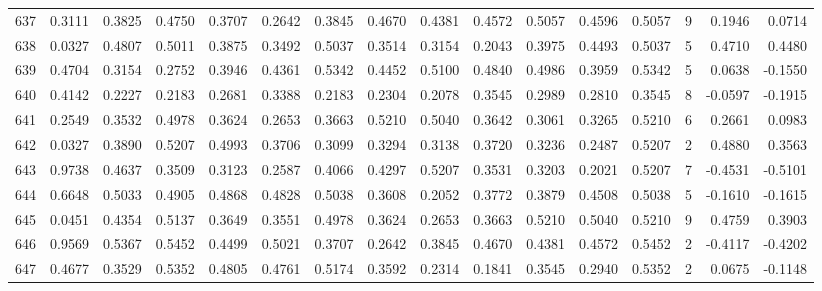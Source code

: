 \begin{tabular}{lrrrrrrrrrrrrrrr}
637 &      0.3111 &  0.3825 &  0.4750 &  0.3707 &  0.2642 &  0.3845 &  0.4670 &  0.4381 &  0.4572 &  0.5057 &   0.4596 &     0.5057 &      9 &                    0.1946 &                     0.0714 \\
638 &      0.0327 &  0.4807 &  0.5011 &  0.3875 &  0.3492 &  0.5037 &  0.3514 &  0.3154 &  0.2043 &  0.3975 &   0.4493 &     0.5037 &      5 &                    0.4710 &                     0.4480 \\
639 &      0.4704 &  0.3154 &  0.2752 &  0.3946 &  0.4361 &  0.5342 &  0.4452 &  0.5100 &  0.4840 &  0.4986 &   0.3959 &     0.5342 &      5 &                    0.0638 &                    -0.1550 \\
640 &      0.4142 &  0.2227 &  0.2183 &  0.2681 &  0.3388 &  0.2183 &  0.2304 &  0.2078 &  0.3545 &  0.2989 &   0.2810 &     0.3545 &      8 &                   -0.0597 &                    -0.1915 \\
641 &      0.2549 &  0.3532 &  0.4978 &  0.3624 &  0.2653 &  0.3663 &  0.5210 &  0.5040 &  0.3642 &  0.3061 &   0.3265 &     0.5210 &      6 &                    0.2661 &                     0.0983 \\
642 &      0.0327 &  0.3890 &  0.5207 &  0.4993 &  0.3706 &  0.3099 &  0.3294 &  0.3138 &  0.3720 &  0.3236 &   0.2487 &     0.5207 &      2 &                    0.4880 &                     0.3563 \\
643 &      0.9738 &  0.4637 &  0.3509 &  0.3123 &  0.2587 &  0.4066 &  0.4297 &  0.5207 &  0.3531 &  0.3203 &   0.2021 &     0.5207 &      7 &                   -0.4531 &                    -0.5101 \\
644 &      0.6648 &  0.5033 &  0.4905 &  0.4868 &  0.4828 &  0.5038 &  0.3608 &  0.2052 &  0.3772 &  0.3879 &   0.4508 &     0.5038 &      5 &                   -0.1610 &                    -0.1615 \\
645 &      0.0451 &  0.4354 &  0.5137 &  0.3649 &  0.3551 &  0.4978 &  0.3624 &  0.2653 &  0.3663 &  0.5210 &   0.5040 &     0.5210 &      9 &                    0.4759 &                     0.3903 \\
646 &      0.9569 &  0.5367 &  0.5452 &  0.4499 &  0.5021 &  0.3707 &  0.2642 &  0.3845 &  0.4670 &  0.4381 &   0.4572 &     0.5452 &      2 &                   -0.4117 &                    -0.4202 \\
647 &      0.4677 &  0.3529 &  0.5352 &  0.4805 &  0.4761 &  0.5174 &  0.3592 &  0.2314 &  0.1841 &  0.3545 &   0.2940 &     0.5352 &      2 &                    0.0675 &                    -0.1148 \\

\end{tabular}
